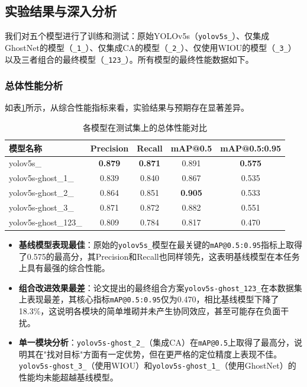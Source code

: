 \documentclass[a4paper]{ctexart}
\begin{document}
\subsection{实验结果与深入分析}
我们对五个模型进行了训练和测试：原始YOLOv5s（\texttt{yolov5s\_}）、仅集成GhostNet的模型（\texttt{\_1\_}）、仅集成CA的模型（\texttt{\_2\_}）、仅使用WIOU的模型（\texttt{\_3\_}）以及三者组合的最终模型（\texttt{\_123\_}）。所有模型的最终性能数据如下。

\subsubsection{总体性能分析}
如表\ref{tab:overall-performance}所示，从综合性能指标来看，实验结果与预期存在显著差异。

\begin{table}[H]
    \centering
    \caption{各模型在测试集上的总体性能对比}
    \label{tab:overall-performance}
    \begin{tabular}{lcccc}
        \toprule
        \textbf{模型名称} & \textbf{Precision} & \textbf{Recall} & \textbf{mAP@0.5} & \textbf{mAP@0.5:0.95} \\
        \midrule
        yolov5s\_             & \textbf{0.879} & \textbf{0.871} & 0.891          & \textbf{0.575} \\
        yolov5s-ghost\_1\_    & 0.839          & 0.840          & 0.867          & 0.535          \\
        yolov5s-ghost\_2\_    & 0.864          & 0.851          & \textbf{0.905} & 0.533          \\
        yolov5s-ghost\_3\_    & 0.871          & 0.872          & 0.882          & 0.551          \\
        yolov5s-ghost\_123\_  & 0.809          & 0.784          & 0.817          & 0.470          \\
        \bottomrule
    \end{tabular}
\end{table}

\begin{itemize}
    \item \textbf{基线模型表现最佳}：原始的\texttt{yolov5s\_}模型在最关键的\texttt{mAP@0.5:0.95}指标上取得了0.575的最高分，其Precision和Recall也同样领先，这表明基线模型在本任务上具有最强的综合性能。
    \item \textbf{组合改进效果最差}：论文提出的最终组合方案\texttt{yolov5s-ghost\_123\_}在本数据集上表现最差，其核心指标\texttt{mAP@0.5:0.95}仅为0.470，相比基线模型下降了18.3\%，这说明各模块的简单堆砌并未产生协同效应，甚至可能存在负面干扰。
    \item \textbf{单一模块分析}：\texttt{yolov5s-ghost\_2\_}（集成CA）在\texttt{mAP@0.5}上取得了最高分，说明其在"找对目标"方面有一定优势，但在更严格的定位精度上表现不佳。\texttt{yolov5s-ghost\_3\_}（使用WIOU）和\texttt{yolov5s-ghost\_1\_}（使用GhostNet）的性能均未能超越基线模型。
\end{itemize}
\end{document}
